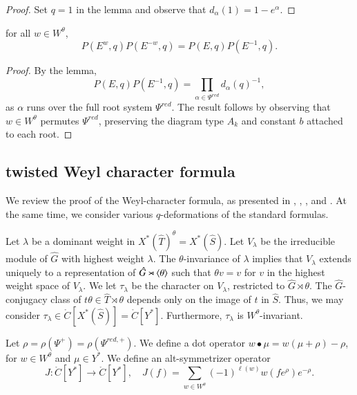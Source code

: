 \begin{proof}  
Set $q=1$ in the lemma and observe that $d_\alpha(1)=1-e^\alpha$.
\end{proof}


\begin{corollary}\label{cor:weyl-p}  
for all $w\in W^\theta$,
\[
P(E^w,q) P(E^{-w},q) = P(E,q)P(E^{-1},q).
\]
\end{corollary}

\begin{proof} 
By the lemma,
\[
P(E,q)P(E^{-1},q) = \prod_{\alpha\in \Psi^{red}} d_{\alpha}(q)^{-1},
\]
as $\alpha$ runs over the full root system $\Psi^{red}$.  The result
follows by observing that $w\in W^\theta$ permutes $\Psi^{red}$,
preserving the diagram type $A_k$ and constant $b$ attached to each
root.
\end{proof}



\subsection{twisted Weyl character formula}\label{sec:weyl-char}

We review the proof of the Weyl-character formula, as presented in
\cite{kostant1961lie}, \cite{jantzen1977darstellungen},
\cite{wendt2001weyl}, and \cite{kumar2009characters}.  At the same
time, we consider various $q$-deformations of the standard formulas.

Let $\lambda$ be a dominant weight in $X^*(\hat T)^\theta = X^*(\hat
S)$.  Let $V_\lambda$ be the irreducible module of $\hat G$ with
highest weight $\lambda$.  The $\theta$-invariance of $\lambda$
implies that $V_\lambda$ extends uniquely to a representation of $\hat
G \rtimes \langle{\theta}\rangle$ such that $\theta v = v$ for $v$ in the
highest weight space of $V_\lambda$.  We let $\tau_\lambda$ be the
character on $V_\lambda$, restricted to $\hat G\rtimes\theta$.   The
$\hat G$-conjugacy class of $t\theta\in \hat T\rtimes\theta$ depends
only on the image of $t$ in $\hat S$.  Thus, we may consider
$\tau_\lambda\in \ring{C}[X^*(\hat S)] =\ring{C}[Y^*]$.  Furthermore,
$\tau_\lambda$ is $W^\theta$-invariant.

Let $\rho = \rho(\Psi^+) = \rho(\Psi^{red,+})$.  We define a dot
operator $w\bullet \mu = w(\mu+\rho)-\rho$, for $w\in W^\theta$ and
$\mu\in Y^*$.  We define an alt-symmetrizer operator
\[
J:\ring{C}[Y^*]\to \ring{C}[Y^*],
\quad J(f) = \sum_{w\in W^\theta} (-1)^{\ell(w)} w(f e^\rho) e^{-\rho}.
\]


